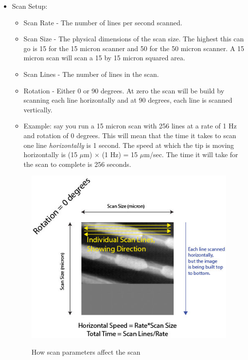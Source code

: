 \documentclass{../lab}
\begin{document}
\begin{itemize}
    \item Scan Setup:

    \begin{itemize}
        \item Scan Rate - The number of lines per second scanned.

        \item Scan Size - The physical dimensions of the scan size. The highest this can go is 15 for the 15 micron scanner and 50 for the 50 micron scanner. A 15 micron scan will scan a 15 by 15 micron squared area.

        \item Scan Lines - The number of lines in the scan.

        \item Rotation - Either 0 or 90 degrees. At zero the scan will be build by scanning each line horizontally and at 90 degrees, each line is scanned vertically.

        \item Example: say you run a 15 micron scan with 256 lines at a rate of 1 Hz and rotation of 0 degrees. This will mean that the time it takes to scan one line \emph{horizontally} is 1 second. The speed at which the tip is moving horizontally is (15 $\mu$m) $\times$ (1 Hz) = 15 $\mu$m/sec.  The time it will take for the scan to complete is 256 seconds.
    \end{itemize}

    \begin{figure}[h]
    \centering
        \href{http://experimentationlab.berkeley.edu/sites/default/files/AFMImages/scanningmethod.jpg}{\includegraphics[width=0.617\linewidth]{images/scanningmethod.jpg}}
        \caption{How scan parameters affect the scan}
    \end{figure}


\end{itemize}
\end{document}
